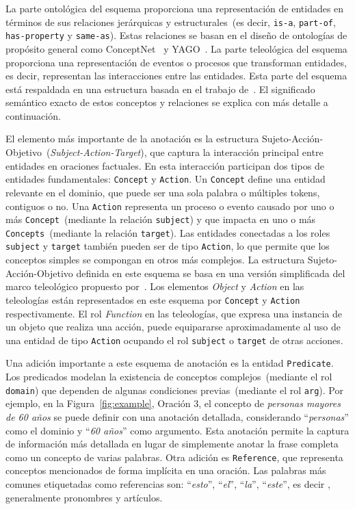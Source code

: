 La parte ontológica del esquema proporciona una representación de entidades en términos de sus relaciones jerárquicas y estructurales~(es decir, \texttt{is-a}, \texttt{part-of}, \texttt{has-property} y \texttt{same-as}).
Estas relaciones se basan en el diseño de ontologías de propósito general como ConceptNet~\cite{speer2017conceptnet} y YAGO~\cite{suchanek2007yago}.
La parte teleológica del esquema proporciona una representación de eventos o procesos que transforman entidades, es decir, representan las interacciones entre las entidades.
Esta parte del esquema está respaldada en una estructura basada en el trabajo de~\citet{teleologies}.
El significado semántico exacto de estos conceptos y relaciones se explica con más detalle a continuación.

El elemento más importante de la anotación es la estructura Sujeto-Acción-Objetivo~(\textit{Subject-Action-Target}), que captura la interacción principal entre entidades en oraciones factuales.
En esta interacción participan dos tipos de entidades fundamentales: \texttt{Concept} y \texttt{Action}.
Un \texttt{Concept} define una entidad relevante en el dominio, que puede ser una sola palabra o múltiples tokens, contiguos o no.
Una \texttt{Action} representa un proceso o evento causado por uno o más \texttt{Concept}~(mediante la relación \texttt{subject}) y que impacta en uno o más \texttt{Concepts}~(mediante la relación \texttt{target}).
Las entidades conectadas a los roles \texttt{subject} y \texttt{target} también pueden ser de tipo \texttt{Action}, lo que permite que los conceptos simples se compongan en otros más complejos.
La estructura Sujeto-Acción-Objetivo definida en este esquema se basa en una versión simplificada del marco teleológico propuesto por~\citet{teleologies}. Los elementos \textit{Object} y \textit{Action} en las teleologías están representados en este esquema por \texttt{Concept} y \texttt {Action} respectivamente.
El rol \textit{Function} en las teleologías, que expresa una instancia de un objeto que realiza una acción, puede equipararse aproximadamente al uso de una entidad de tipo \texttt{Action} ocupando el rol \texttt{subject} o \texttt{target} de otras acciones.

Una adición importante a este esquema de anotación es la entidad \texttt{Predicate}.
Los predicados modelan la existencia de conceptos complejos~(mediante el rol \texttt{domain}) que dependen de algunas condiciones previas~(mediante el rol \texttt{arg}).
Por ejemplo, en la Figura~\ref{fig:example}, Oración 3, el concepto de \textit{personas mayores de 60 años} se puede definir con una anotación detallada, considerando ``\textit{personas}'' como el dominio y ``\textit{60 años}'' como argumento. Esta anotación permite la captura de información más detallada en lugar de simplemente anotar la frase completa como un concepto de varias palabras.
Otra adición es \texttt{Reference}, que representa conceptos mencionados de forma implícita en una oración.
Las palabras más comunes etiquetadas como referencias son: ``\textit{esto}'', ``\textit{el}'', ``\textit{la}'', ``\textit{este}'', es decir , generalmente pronombres y artículos.

